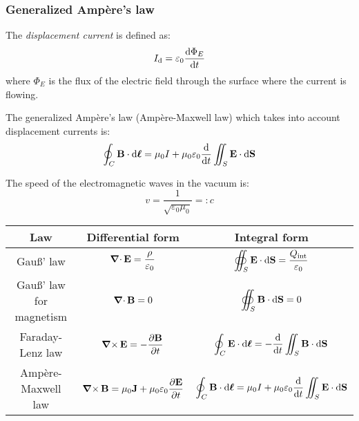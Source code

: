 \documentclass[../../../main.tex]{subfiles}
\begin{document}
\begin{multicols}{2}
  \subsubsection{Generalized Ampère's law}
  \begin{definition}
    The \emph{displacement current} is defined as: $$I_\text{d}=\varepsilon_0\dv{\Phi_E}{t}$$ where $\Phi_E$ is the flux of the electric field through the surface where the current is flowing.
  \end{definition}
  \begin{law}
    The generalized Ampère's law (Ampère-Maxwell law) which takes into account displacement currents is: $$\oint_C\boldsymbol{\mathrm{B}}\cdot \dd{\boldsymbol{\mathrm{\ell}}}=\mu_0 I+\mu_0\varepsilon_0\dv{}{t}\iint_S\boldsymbol{\mathrm{E}}\cdot \dd{\boldsymbol{\mathrm{S}}}$$
  \end{law}
  \begin{definition}
    The speed of the electromagnetic waves in the vacuum is: $$v=\frac{1}{\sqrt{\varepsilon_0\mu_0}}=:c$$
  \end{definition}
\end{multicols}
\begin{table}[ht]
  \centering
  \renewcommand{\arraystretch}{2.5}
  \begin{tabular}{|c|c|c|}
    \hline
    \bfseries Law             & \bfseries Differential form                                                                 & \bfseries Integral form                                                                                            \\
    \hline
    Gau\ss' law               & $\displaystyle \operatorname{\boldsymbol{\mathrm{\nabla}}\cdot}\boldsymbol{\mathrm{E}}=\frac{\rho}{\varepsilon_0}$                                      & $\displaystyle \oiint_S\boldsymbol{\mathrm{E}}\cdot \dd{\boldsymbol{\mathrm{S}}}=\frac{Q_{\text{int}}}{\varepsilon_0}$                               \\
    \hline
    Gau\ss' law for magnetism & $\displaystyle \operatorname{\boldsymbol{\mathrm{\nabla}}\cdot}\boldsymbol{\mathrm{B}}=0$                                                               & $\displaystyle \oiint_S\boldsymbol{\mathrm{B}}\cdot \dd{\boldsymbol{\mathrm{S}}}=0$                                                                  \\
    \hline
    Faraday-Lenz law          & $\displaystyle \operatorname{\boldsymbol{\mathrm{\nabla}}\times}\boldsymbol{\mathrm{E}}=-\frac{\partial\boldsymbol{\mathrm{B}}}{\partial t}$                              & $\displaystyle \oint_C\boldsymbol{\mathrm{E}}\cdot \dd{\boldsymbol{\mathrm{\ell}}}=-\dv{}{t}\iint_S\boldsymbol{\mathrm{B}}\cdot \dd{\boldsymbol{\mathrm{S}}}$                          \\
    \hline
    Ampère-Maxwell law        & $\displaystyle \operatorname{\boldsymbol{\mathrm{\nabla}}\times}\boldsymbol{\mathrm{B}}=\mu_0\boldsymbol{\mathrm{J}}+\mu_0\varepsilon_0\frac{\partial\boldsymbol{\mathrm{E}}}{\partial t}$ & $\displaystyle \oint_C\boldsymbol{\mathrm{B}}\cdot \dd{\boldsymbol{\mathrm{\ell}}}=\mu_0 I+\mu_0\varepsilon_0\dv{}{t}\iint_S\boldsymbol{\mathrm{E}}\cdot \dd{\boldsymbol{\mathrm{S}}}$ \\
    \hline
  \end{tabular}
\end{table}
\end{document}
